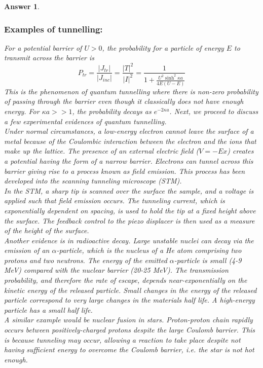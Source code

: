 \documentclass[a4paper]{article}
\newtheorem{ans}{Answer}[subsection]
\theoremstyle{new}
\begin{document}
\begin{ans}
\subsubsection*{Examples of tunnelling:}
For a potential barrier of $U>0$, the probability for a particle of energy $E$ to transmit across the barrier is
$$P_{tr}=\frac{|J_{tr}|}{|J_{inc}|}=\frac{|T|^2}{|I|^2}=\frac{1}{1+\frac{U^2\sinh^2\kappa a}{4E(U-E)}}$$
This is the phenomenon of quantum tunnelling where there is non-zero probability of passing through the barrier even though it classically does not have enough energy. For $\kappa a>>1$, the probability decays as $e^{-2\kappa a}$. Next, we proceed to discuss a few experimental evidences of quantum tunnelling.\\[5pt]
Under normal circumstances, a low-energy electron cannot leave the surface of a metal because of the Coulombic interaction between the electron and the ions that make up the lattice.
The presence of an external electric field ($V =-Ex$) creates a potential having the form of a narrow barrier. Electrons can tunnel across this barrier giving rise to a process known as field emission. This process has been developed into the scanning tunneling microscope (STM).\\[5pt]
In the STM, a sharp tip is scanned over the surface the sample, and a voltage is applied such that field emission occurs. The tunneling current, which is exponentially dependent on spacing, is used to hold the tip at a fixed height above the surface. The feedback control to the piezo displacer is then used as a measure of the height of the surface.\\[5pt]
Another evidence is in radioactive decay. Large unstable nuclei can decay via the emission of an $\alpha$-particle, which is the nucleus of a He atom comprising two protons and two neutrons. The energy of the emitted $\alpha$-particle is small (4-9 MeV) compared with the nuclear barrier (20-25 MeV). The transmission probability, and therefore the rate of escape, depends near-exponentially on the kinetic energy of the released particle. Small changes in the energy of the released particle correspond to very large changes in the materials half life. A high-energy particle has a small half life.\\[5pt]
A similar example would be nuclear fusion in stars. Proton-proton chain rapidly occurs between positively-charged protons despite the large Coulomb barrier. This is because tunneling may occur, allowing a reaction to take place despite not having sufficient energy to overcome the Coulomb barrier, i.e. the star is not hot enough.
\newpage

\end{ans}
\end{document}
